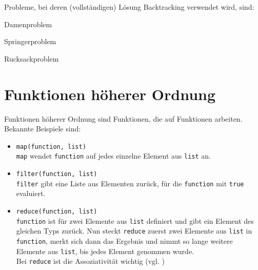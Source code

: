 \begin{beispiel}[Backtracking]
    Probleme, bei deren (vollständigen) Lösung Backtracking verwendet wird, sind:
    \begin{bspenum}
        \item Damenproblem
        \item Springerproblem
        \item Rucksackproblem
    \end{bspenum}
\end{beispiel}

\section{Funktionen höherer Ordnung}
Funktionen höherer Ordnung sind Funktionen, die auf Funktionen arbeiten.
Bekannte Beispiele sind:
\begin{itemize}
    \item \texttt{map(function, list)}\\
          \texttt{map} wendet \texttt{function} auf jedes einzelne
          Element aus \texttt{list} an.
    \item \texttt{filter(function, list)}\\
          \texttt{filter} gibt eine Liste aus Elementen zurück, für 
          die \texttt{function} mit \texttt{true} evaluiert.
    \item \texttt{reduce(function, list)}\\
          \texttt{function} ist für zwei Elemente aus \texttt{list}
          definiert und gibt ein Element des gleichen Typs zurück.
          Nun steckt \texttt{reduce} zuerst zwei Elemente aus \texttt{list}
          in \texttt{function}, merkt sich dann das Ergebnis und nimmt
          so lange weitere Elemente aus \texttt{list}, bis jedes 
          Element genommen wurde.\\
          Bei \texttt{reduce} ist die Assoziativität wichtig (vgl. )
\end{itemize}
